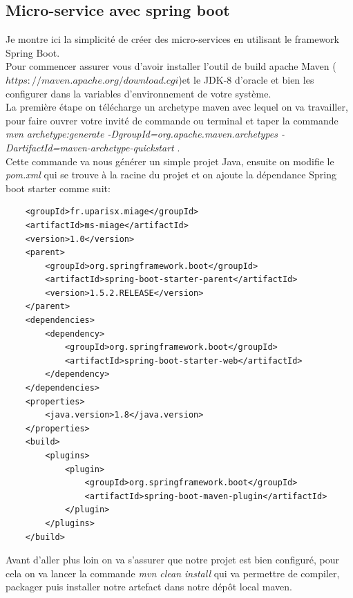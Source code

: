 \documentclass[12pt, a4paper, openany]{report}
\begin{document}
  
\begin{appendices}
 
  \chapter{Micro-service avec spring boot}
  
  \label{annexesb}Je montre ici la simplicité de créer des micro-services en utilisant le framework Spring Boot.\\
  
  Pour commencer assurer vous d'avoir installer l'outil de build apache Maven ($https://maven.apache.org/download.cgi$)et le JDK-8 d'oracle et bien les configurer dans la variables d’environnement de votre système.\\
  
  La première étape on télécharge un archetype maven avec lequel on va travailler, pour faire ouvrer votre invité de commande ou terminal et taper la commande \textit{mvn archetype:generate -DgroupId=org.apache.maven.archetypes -DartifactId=maven-archetype-quickstart} . \\ 
  
  Cette commande va nous générer un simple projet Java, ensuite on modifie le \textit{pom.xml} qui se trouve à la racine du projet et on ajoute la dépendance Spring boot starter comme suit:
  
\begin{lstlisting}
    <groupId>fr.uparisx.miage</groupId>
    <artifactId>ms-miage</artifactId>
    <version>1.0</version>
    <parent>
        <groupId>org.springframework.boot</groupId>
        <artifactId>spring-boot-starter-parent</artifactId>
        <version>1.5.2.RELEASE</version>
    </parent>
    <dependencies>
        <dependency>
            <groupId>org.springframework.boot</groupId>
            <artifactId>spring-boot-starter-web</artifactId>
        </dependency>
    </dependencies>
    <properties>
        <java.version>1.8</java.version>
    </properties>
    <build>
        <plugins>
            <plugin>
                <groupId>org.springframework.boot</groupId>
                <artifactId>spring-boot-maven-plugin</artifactId>
            </plugin>
        </plugins>
    </build>
\end{lstlisting}
 
 Avant d'aller plus loin on va s'assurer que notre projet est bien configuré, pour cela on va lancer la commande  \textit{mvn clean install} qui va permettre de compiler, packager puis installer notre artefact dans notre dépôt local maven.
 

\end{appendices}
\end{document}
